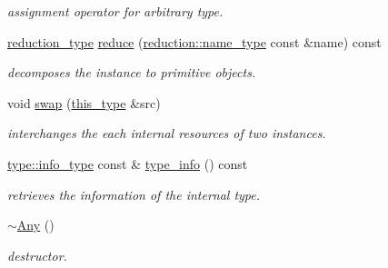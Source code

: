 \begin{DoxyCompactItemize}
\begin{DoxyCompactList}\small\item\em assignment operator for arbitrary type. \end{DoxyCompactList}\item 
\hypertarget{classhryky_1_1_any_a53cbd925fa67505daab6e79749559517}{\hyperlink{namespacehryky_a343a9a4c36a586be5c2693156200eadc}{reduction\-\_\-type} \hyperlink{classhryky_1_1_any_a53cbd925fa67505daab6e79749559517}{reduce} (\hyperlink{namespacehryky_1_1reduction_ac686c30a4c8d196bbd0f05629a6b921f}{reduction\-::name\-\_\-type} const \&name) const }\label{classhryky_1_1_any_a53cbd925fa67505daab6e79749559517}

\begin{DoxyCompactList}\small\item\em decomposes the instance to primitive objects. \end{DoxyCompactList}\item 
\hypertarget{classhryky_1_1_any_a1603aaa3243f8aaae407c6a5e4287bb6}{void \hyperlink{classhryky_1_1_any_a1603aaa3243f8aaae407c6a5e4287bb6}{swap} (\hyperlink{classhryky_1_1_any_accb3d649460111ed6f04293f3e5865bc}{this\-\_\-type} \&src)}\label{classhryky_1_1_any_a1603aaa3243f8aaae407c6a5e4287bb6}

\begin{DoxyCompactList}\small\item\em interchanges the each internal resources of two instances. \end{DoxyCompactList}\item 
\hypertarget{classhryky_1_1_any_a17068d39ea56f8b086e4c97086082b30}{\hyperlink{classhryky_1_1type_1_1_info}{type\-::info\-\_\-type} const \& \hyperlink{classhryky_1_1_any_a17068d39ea56f8b086e4c97086082b30}{type\-\_\-info} () const }\label{classhryky_1_1_any_a17068d39ea56f8b086e4c97086082b30}

\begin{DoxyCompactList}\small\item\em retrieves the information of the internal type. \end{DoxyCompactList}\item 
\hypertarget{classhryky_1_1_any_a703e5beebe52102b0db2cef37f92df3f}{\hyperlink{classhryky_1_1_any_a703e5beebe52102b0db2cef37f92df3f}{$\sim$\-Any} ()}\label{classhryky_1_1_any_a703e5beebe52102b0db2cef37f92df3f}

\begin{DoxyCompactList}\small\item\em destructor. \end{DoxyCompactList}\end{DoxyCompactItemize}
